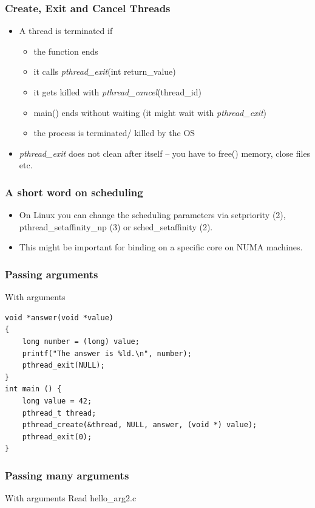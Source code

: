 \documentclass[10pt]{beamer}
\begin{document}
\begin{frame}
	\frametitle{Create, Exit and Cancel Threads}
	\begin{itemize}
		\item A thread is terminated if
		\begin{itemize}
			\item the function ends
			\item it calls {\it pthread\_exit}(int return\_value)
			\item it gets killed with {\it pthread\_cancel}(thread\_id)
			\item main() ends without waiting (it might wait with {\it pthread\_exit})
			\item the process is terminated/ killed by the OS
		\end{itemize}
		\item {\it pthread\_exit} does not clean after itself -- you have to free() memory, close files etc.
	\end{itemize}
\end{frame}


\begin{frame}
	\frametitle{A short word on scheduling}
	\begin{itemize}
		\item On Linux you can change the scheduling parameters via setpriority (2), pthread\_setaffinity\_np (3) or sched\_setaffinity (2).
		\item This might be important for binding on a specific core on NUMA machines.
	\end{itemize}
\end{frame}



\begin{frame}[fragile]
	\frametitle{Passing arguments}
\begin{block}{With arguments}
\begin{lstlisting}
void *answer(void *value)
{
    long number = (long) value;
    printf("The answer is %ld.\n", number);
    pthread_exit(NULL);
}
int main () {
    long value = 42;
    pthread_t thread;
    pthread_create(&thread, NULL, answer, (void *) value);
    pthread_exit(0);
}
\end{lstlisting}
\end{block}
\end{frame}


\begin{frame}
	\frametitle{Passing many arguments}
\begin{block}{With arguments}
Read hello\_arg2.c
\end{block}
\end{frame}
\end{document}
